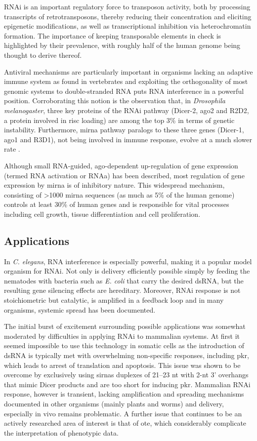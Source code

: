 RNAi is an important regulatory force to transposon activity, both by processing transcripts of retrotransposons, thereby reducing their concentration and eliciting epigenetic modifications, as well as transcriptional inhibition via heterochromatin formation. The importance of keeping transposable elements in check is highlighted by their prevalence, with roughly half of the human genome being thought to derive thereof.

Antiviral mechanisms are particularly important in organisms lacking an adaptive immune system as found in vertebrates and exploiting the orthogonality of most genomic systems to double-stranded RNA puts RNA interference in a powerful position. Corroborating this notion is the observation that, in \textit{Drosophila melanogaster}, three key proteins of the RNAi pathway (Dicer-2, \gls{ago}2 and R2D2, a protein involved in \gls{risc} loading) are among the top 3\% in terms of genetic instability. Furthermore, \gls{mirna} pathway paralogs to these three genes (Dicer-1, \gls{ago}1 and R3D1), not being involved in immune response, evolve at a much slower rate \citep{Obbard2009}.

Although small RNA-guided, \gls{ago}-dependent up-regulation of gene expression (termed RNA activation or RNAa) has been described, most regulation of gene expression by \gls{mirna} is of inhibitory nature. This widespread mechanism, consisting of \textgreater 1000 \gls{mirna} sequences (as much as 5\% of the human genome) controls at least 30\% of human genes and is responsible for vital processes including cell growth, tissue differentiation and cell proliferation.

\subsection{Applications}
In \textit{C. elegans}, RNA interference is especially powerful, making it a popular model organism for RNAi. Not only is delivery efficiently possible simply by feeding the nematodes with bacteria such as \textit{E. coli} that carry the desired dsRNA, but the resulting gene silencing effects are hereditary. Moreover, RNAi response is not stoichiometric but catalytic, is amplified in a feedback loop and in many organisms, systemic spread has been documented.

The initial burst of excitement surrounding possible applications was somewhat moderated by difficulties in applying RNAi to mammalian systems. At first it seemed impossible to use this technology in somatic cells as the introduction of dsRNA is typically met with overwhelming non-specific responses, including  \gls{pkr}, which leads to arrest of translation and apoptosis. This issue was shown to be overcome by exclusively using \glspl{sirna} duplexes of 21--23 nt with 2-nt 3' overhangs that mimic Dicer products and are too short for inducing \gls{pkr}. Mammalian RNAi response, however is transient, lacking amplification and spreading mechanisms documented in other organisms (mainly plants and worms) and delivery, especially in vivo remains problematic. A further issue that continues to be an actively researched area of interest is that of \gls{ote}, which considerably complicate the interpretation of phenotypic data.

